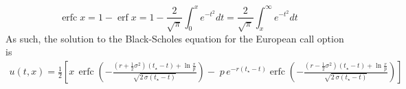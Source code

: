 \documentclass{article}
\numberwithin{equation}{section}
\begin{document}
\begin{equation*}
    \operatorname{erfc} x = 1-\operatorname{erf}x=1-\frac{2}{\sqrt{\pi}}\int^x_0 e^{-t^2}dt = \frac{2}{\sqrt{\pi}} \int^\infty_xe^{-t^2}dt
\end{equation*}
As such, the solution to the Black-Scholes equation for the European call option is 
\begin{equation*}
\begin{split}
    u(t,x) = \frac{1}{2}\left[ x\,\operatorname{erfc}\left(-\frac{\left(r + \tfrac{1}{2}\sigma^{2}\right)(t_\star - t) + \ln\frac{x}{p}}{\sqrt{2\,\sigma(t_\star - t)}}\right)  
    -\; p\, e^{-r(t_\star-t)}\operatorname{erfc}\left(-\frac{\left(r - \tfrac{1}{2}\sigma^{2}\right)(t_{\star} - t) + \ln\frac{x}{p}}{\sqrt{2\,\sigma(t_{\star} - t)}}\right)\right]
\end{split}
\end{equation*}
\end{document}
